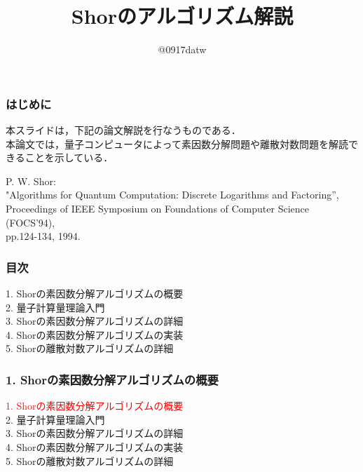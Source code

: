 \documentclass[dvipdfmx,12pt]{beamer}
\title{Shorのアルゴリズム解説}
\author[Laplace0917]{@0917datw}
\date{}
\begin{document}
\maketitle


\begin{frame}

\frametitle{はじめに}

本スライドは，下記の論文解説を行なうものである．\\
本論文では，量子コンピュータによって素因数分解問題や離散対数問題を解読できることを示している．\\
  
\vspace{25pt}

\begin{center}
    P. W. Shor: \\
    "Algorithms for Quantum Computation: Discrete Logarithms and Factoring”, \\
    Proceedings of IEEE Symposium on Foundations of Computer Science (FOCS’94), \\
    pp.124-134, 1994.
\end{center}

\end{frame}


\begin{frame}

\frametitle{目次}

1. Shorの素因数分解アルゴリズムの概要 \\
2. 量子計算量理論入門 \\
3. Shorの素因数分解アルゴリズムの詳細 \\
4. Shorの素因数分解アルゴリズムの実装 \\
5. Shorの離散対数アルゴリズムの詳細
    
\end{frame}


\begin{frame}

\frametitle{1. Shorの素因数分解アルゴリズムの概要}
  
\textcolor{red}{1. Shorの素因数分解アルゴリズムの概要} \\
2. 量子計算量理論入門 \\
3. Shorの素因数分解アルゴリズムの詳細 \\
4. Shorの素因数分解アルゴリズムの実装 \\
5. Shorの離散対数アルゴリズムの詳細
      
\end{frame}
\end{document}
